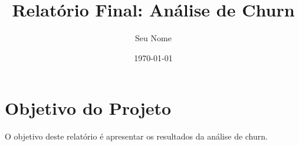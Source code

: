 \documentclass{article}
\title{Relatório Final: Análise de Churn}
\author{Seu Nome}
\date{\today}
\begin{document}
\maketitle

\tableofcontents

\section{Objetivo do Projeto}
O objetivo deste relatório é apresentar os resultados da análise de churn.
\end{document}
